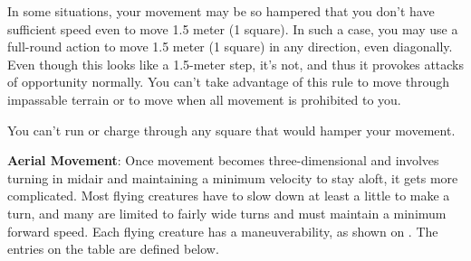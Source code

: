 In some situations, your movement may be so hampered that you don't have sufficient speed even to move 1.5 meter (1 square). In such a case, you may use a full-round action to move 1.5 meter (1 square) in any direction, even diagonally. Even though this looks like a 1.5-meter step, it's not, and thus it provokes attacks of opportunity normally. You can't take advantage of this rule to move through impassable terrain or to move when all movement is prohibited to you.

You can't run or charge through any square that would hamper your movement.

\textbf{Aerial Movement}: Once movement becomes three-dimensional and involves turning in midair and maintaining a minimum velocity to stay aloft, it gets more complicated. Most flying creatures have to slow down at least a little to make a turn, and many are limited to fairly wide turns and must maintain a minimum forward speed. Each flying creature has a maneuverability, as shown on . The entries on the table are defined below.


